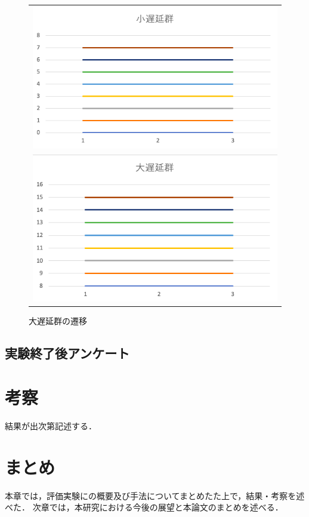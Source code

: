 \begin{figure}[htb]
\begin{center}
\begin{tabular}{c}

  \begin{minipage}[htb]{\linewidth}
  \begin{center}
  \includegraphics[width=12cm]{images/7/4.png}
  \caption{小遅延群の推移}
  \label{fig:4}
  \end{center}
  \end{minipage}
  
  \\
  
  \begin{minipage}[htb]{\linewidth}
  \begin{center}
  \includegraphics[width=12cm]{images/7/5.png}
  \caption{大遅延群の遷移}
  \label{fig:5}
  \end{center}
  \end{minipage}

\end{tabular}
\end{center}
\end{figure}

\subsection{実験終了後アンケート}

\section{考察}
結果が出次第記述する．

\section{まとめ}
本章では，評価実験にの概要及び手法についてまとめたた上で，結果・考察を述べた．
次章では，本研究における今後の展望と本論文のまとめを述べる．
